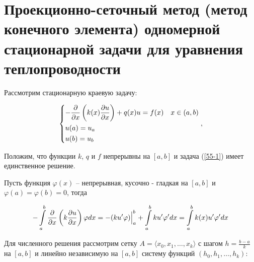 \documentclass[__main__.tex]{subfiles}
\begin{document}
\section{Проекционно-сеточный метод (метод конечного элемента) одномерной стационарной задачи для уравнения теплопроводности}

Рассмотрим стационарную краевую задачу:

\begin{gather}
\left\{
\begin{gathered}
-\frac{\partial}{\partial x}\left( k(x)\frac{\partial u}{\partial x} \right)+q(x)u=f(x)
\quad
x\in(a,b)
\hfill\\
u(a) = u_a\hfill\\
u(b) = u_b\hfill\\
\end{gathered}
\right.,
\label{55-1}
\end{gather}

Положим, что функции $k$, $q$ и $f$ непрерывны на $[a,b]$ и задача (\ref{55-1}) имеет единственное решение.

Пусть функция $\varphi(x)$ -- непрерывная, кусочно - гладкая на $[a,b]$ и $\varphi(a)=\varphi(b)=0$, тогда

\begin{gather}
-\int\limits_{a}^{b}\frac{\partial}{\partial x}\left(k\frac{\partial u}{\partial x}\right)\varphi{dx}
=
-(ku^{\prime}\varphi)\Big{|}_a^b + \int\limits_{a}^{b}ku^{\prime}\varphi^{\prime}{dx}
=
\int\limits_a^b k(x)u^{\prime}\varphi^{\prime}{dx}
\label{55-2}
\end{gather}

Для численного решения рассмотрим сетку $A=\langle x_0,x_1,\dots,x_k \rangle$ с шагом $h=\frac{b-a}{k}$ на $[a,b]$ и линейно независимую на $[a,b]$ систему функций $(h_0,h_1,\dots,h_k)$:
\end{document}
